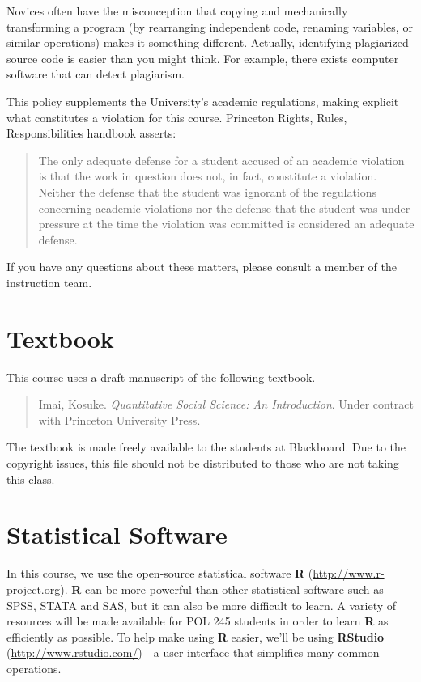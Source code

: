 \documentclass[11pt,letterpaper]{article}
\newcommand\R{\textsf{\textbf{R}}}
\newcommand\Rst{\textsf{\textbf{RStudio}}}
\begin{document}
Novices often have the misconception that copying and mechanically
transforming a program (by rearranging independent code, renaming
variables, or similar operations) makes it something different.
Actually, identifying plagiarized source code is easier than you might
think.  For example, there exists computer software that can detect
plagiarism.

This policy supplements the University's academic regulations, making
explicit what constitutes a violation for this course. Princeton
Rights, Rules, Responsibilities handbook asserts:

\begin{quote}
  The only adequate defense for a student accused of an academic
  violation is that the work in question does not, in fact, constitute
  a violation. Neither the defense that the student was ignorant of
  the regulations concerning academic violations nor the defense that
  the student was under pressure at the time the violation was
  committed is considered an adequate defense.
\end{quote}
If you have any questions about these matters, please consult a member of the
instruction team.


\section*{Textbook}

This course uses a draft manuscript of the following textbook.
\begin{quote}
  Imai, Kosuke. {\it Quantitative Social Science: An Introduction}.
  Under contract with Princeton University Press.
\end{quote}
The textbook is made freely available to the students at Blackboard.
Due to the copyright issues, this file should not be distributed to
those who are not taking this class.  

\section*{Statistical Software}

In this course, we use the open-source statistical software \R{}
(\url{http://www.r-project.org}).  \R{} can be more powerful than
other statistical software such as SPSS, STATA and SAS, but it can
also be more difficult to learn.  A variety of resources will be made
available for POL 245 students in order to learn \R{} as efficiently
as possible.  To help make using \R{} easier, we'll be using \Rst{}
(\url{http://www.rstudio.com/})---a user-interface that simplifies
many common operations.
\end{document}
